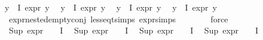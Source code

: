 \begin{isabellebody}
{\isachardoublequoteopen}{\isasymforall}y{\isasymin}{\isasymPhi}\ {\isacharbackquote}{\kern0pt}\ I{\isachardot}{\kern0pt}\ expr{\isacharunderscore}{\kern0pt}{}\ y\ {\isasymle}\ {}{\isachardoublequoteclose}\isanewline
{\isachardoublequoteopen}{\isasymforall}y{\isasymin}{\isasymPhi}\ {\isacharbackquote}{\kern0pt}\ I{\isachardot}{\kern0pt}\ expr{\isacharunderscore}{\kern0pt}{}\ y\ {\isasymle}\ {}{\isachardoublequoteclose}\isanewline
{\isachardoublequoteopen}{\isasymforall}y{\isasymin}{\isasymPhi}\ {\isacharbackquote}{\kern0pt}\ I{\isachardot}{\kern0pt}\ expr{\isacharunderscore}{\kern0pt}{}\ y\ {\isasymle}\ {}{\isachardoublequoteclose}\isanewline
{\isachardoublequoteopen}{\isasymforall}y{\isasymin}{\isasymPhi}\ {\isacharbackquote}{\kern0pt}\ I{\isachardot}{\kern0pt}\ expr{\isacharunderscore}{\kern0pt}{}\ y\ {\isasymle}\ {}{\isachardoublequoteclose}\isanewline
\ \ \ \ \ \ \isamarkupfalse%
\ expr{\isacharunderscore}{\kern0pt}nested{\isacharunderscore}{\kern0pt}empty{\isacharunderscore}{\kern0pt}conj\ less{\isacharunderscore}{\kern0pt}eq{\isacharunderscore}{\kern0pt}t{\isachardot}{\kern0pt}simps\ expr{\isachardot}{\kern0pt}simps\isanewline
\ \ \ \ \ \ \isamarkupfalse%
\ force{\isacharplus}{\kern0pt}\isanewline
\isanewline
\ \ \ \ \isamarkupfalse%
\ {\isachardoublequoteopen}Sup\ {\isacharparenleft}{\kern0pt}{\isacharparenleft}{\kern0pt}expr{\isacharunderscore}{\kern0pt}{}\ {\isasymcirc}\ {\isasymPhi}{\isacharparenright}{\kern0pt}\ {\isacharbackquote}{\kern0pt}\ I{\isacharparenright}{\kern0pt}\ {\isasymle}\ {}{\isachardoublequoteclose}\isanewline
{\isachardoublequoteopen}Sup\ {\isacharparenleft}{\kern0pt}{\isacharparenleft}{\kern0pt}expr{\isacharunderscore}{\kern0pt}{}\ {\isasymcirc}\ {\isasymPhi}{\isacharparenright}{\kern0pt}\ {\isacharbackquote}{\kern0pt}\ I{\isacharparenright}{\kern0pt}\ {\isasymle}\ {}{\isachardoublequoteclose}\isanewline
{\isachardoublequoteopen}Sup\ {\isacharparenleft}{\kern0pt}{\isacharparenleft}{\kern0pt}expr{\isacharunderscore}{\kern0pt}{}\ {\isasymcirc}\ {\isasymPhi}{\isacharparenright}{\kern0pt}\ {\isacharbackquote}{\kern0pt}\ I{\isacharparenright}{\kern0pt}\ {\isasymle}\ {}{\isachardoublequoteclose}\isanewline
{\isachardoublequoteopen}Sup\ {\isacharparenleft}{\kern0pt}{\isacharparenleft}{\kern0pt}expr{\isacharunderscore}{\kern0pt}{}\ {\isasymcirc}\ {\isasymPhi}{\isacharparenright}{\kern0pt}\ {\isacharbackquote}{\kern0pt}\ I{\isacharparenright}{\kern0pt}\ {\isasymle}\ {}{\isachardoublequoteclose}\isanewline

\end{isabellebody}
